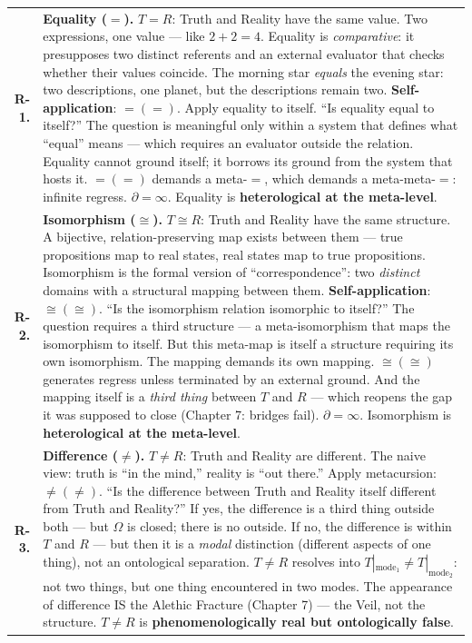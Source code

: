 \documentclass[10pt, openany, oneside]{book}
\renewcommand{\footnotesize}{\fontsize{8.5}{11}\selectfont}
\begin{document}
{\footnotesize
\noindent\begin{tabular}{r p{}}
\textbf{R-1.} & \textbf{Equality ($=$).} $T = R$: Truth and Reality have the same value. Two expressions, one value --- like $2+2 = 4$. Equality is \textit{comparative}: it presupposes two distinct referents and an external evaluator that checks whether their values coincide. The morning star \textit{equals} the evening star: two descriptions, one planet, but the descriptions remain two. \textbf{Self-application}: $=(=)$. Apply equality to itself. ``Is equality equal to itself?'' The question is meaningful only within a system that defines what ``equal'' means --- which requires an evaluator outside the relation. Equality cannot ground itself; it borrows its ground from the system that hosts it. $=(=)$ demands a meta-$=$, which demands a meta-meta-$=$: infinite regress. $\partial = \infty$. Equality is \textbf{heterological at the meta-level}. \\[0.5em]

\textbf{R-2.} & \textbf{Isomorphism ($\cong$).} $T \cong R$: Truth and Reality have the same structure. A bijective, relation-preserving map exists between them --- true propositions map to real states, real states map to true propositions. Isomorphism is the formal version of ``correspondence'': two \textit{distinct} domains with a structural mapping between them. \textbf{Self-application}: $\cong(\cong)$. ``Is the isomorphism relation isomorphic to itself?'' The question requires a third structure --- a meta-isomorphism that maps the isomorphism to itself. But this meta-map is itself a structure requiring its own isomorphism. The mapping demands its own mapping. $\cong(\cong)$ generates regress unless terminated by an external ground. And the mapping itself is a \textit{third thing} between $T$ and $R$ --- which reopens the gap it was supposed to close (Chapter 7: bridges fail). $\partial = \infty$. Isomorphism is \textbf{heterological at the meta-level}. \\[0.5em]

\textbf{R-3.} & \textbf{Difference ($\neq$).} $T \neq R$: Truth and Reality are different. The naive view: truth is ``in the mind,'' reality is ``out there.'' Apply metacursion: $\neq(\neq)$. ``Is the difference between Truth and Reality itself different from Truth and Reality?'' If yes, the difference is a third thing outside both --- but $\Omega$ is closed; there is no outside. If no, the difference is within $T$ and $R$ --- but then it is a \textit{modal} distinction (different aspects of one thing), not an ontological separation. $T \neq R$ resolves into $T|_{\text{mode}_1} \neq T|_{\text{mode}_2}$: not two things, but one thing encountered in two modes. The appearance of difference IS the Alethic Fracture (Chapter 7) --- the Veil, not the structure. $T \neq R$ is \textbf{phenomenologically real but ontologically false}. \\[0.5em]


\end{tabular}}
\end{document}
